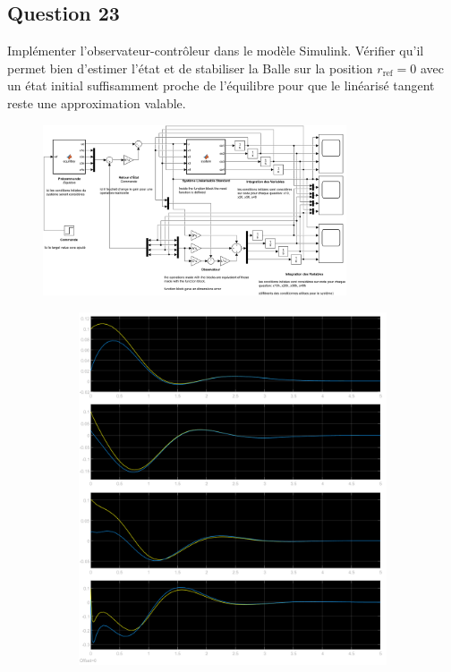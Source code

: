 \documentclass[class=article, crop=false]{standalone}
\begin{document}
\subsection{Question 23}
\begin{exercise}
    Implémenter l'observateur-contrôleur dans le modèle Simulink. Vérifier qu'il permet bien d'estimer l'état et de stabiliser la Balle sur la position $r_{\text{ref}} = 0$ avec un état initial suffisamment proche de l'équilibre pour que le linéarisé tangent reste une approximation valable.
\end{exercise}
\begin{resolution}
    \begin{figure}[H]
        \centering
        \includegraphics[width=0.8\textwidth]{../images/system_simulink_5.png}
        \caption{}
    \end{figure}
    \begin{figure}[H]
        \centering
        \begin{subfigure}[b]{0.475\textwidth}
            \centering
            \includegraphics[width=\textwidth]{../images/simulink_scope5_0_1_02.png}

\end{subfigure}
\end{figure}
\end{resolution}
\end{document}

